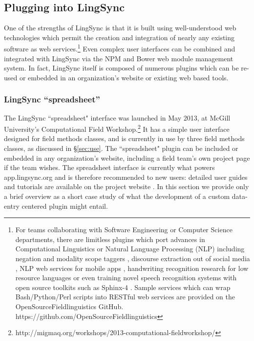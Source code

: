 \documentclass[letterpaper, 12pt, dvips]{mitwpl}
\begin{document}
\subsection{Plugging into LingSync}
\label{sec:plugins}


One of the strengths of LingSync is that it is built using well-understood web technologies which permit the creation and integration of nearly any existing software as web services.\footnote{
For teams collaborating with Software Engineering or Computer Science departments, there are limitless plugins which port advances in Computational Linguistics  \citep{Chen:2011}  or Natural Language Processing (NLP) including  negation and modality scope taggers  \citep{Rosenberg:2012}, %
discourse extraction out of social media  \citep{Dubuc:2010},  
NLP web services for mobile apps \citep{Sateli:2013},
 handwriting recognition research for low resource languages \citep{Sadri:2007} or even training novel speech recognition systems with
 open source toolkits such as Sphinx-4 \citep{Walker:2004}.%
Sample  services which can wrap Bash/Python/Perl scripts  into RESTful web services are provided on the OpenSourceFieldlinguistics GitHub. https://github.com/OpenSourceFieldlinguistics %
}
Even complex user interfaces can be combined and integrated with LingSync via the NPM and Bower web module management system.
In fact, LingSync itself is composed of numerous plugins which can be re-used or embedded in an organization's website or existing web based tools.

\subsubsection{LingSync ``spreadsheet''}
\label{sec:spreadsheet}

The LingSync ``spreadsheet" interface was 
launched in May 2013, at McGill University's Computational Field Workshop.\footnote{http://migmaq.org/workshops/2013-computational-fieldworkshop/} It has a simple user interface designed  for field methods classes, and is currently in use by three field methods classes, as discussed in \S \ref{sec:use}. The ``spreadsheet"  plugin can be included or embedded in any organization's website, including a field team's own project page if the team wishes. The spreadsheet interface is currently what powers app.lingsync.org and is therefore recommended to new users: detailed user guides and tutorials are available on the project website \citep{LingSync:2013}. %
 In this section we provide only a brief overview as a short case study of what the development of a custom data-entry centered plugin might entail. %
\end{document}
